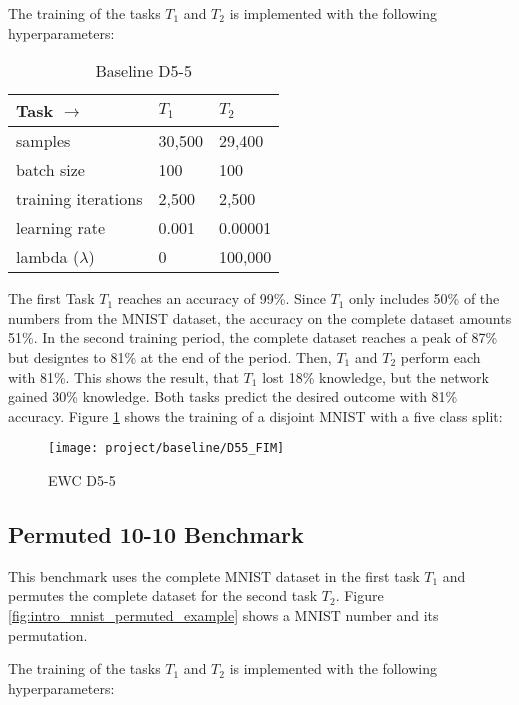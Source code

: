 The training of the tasks $T_1$ and $T_2$ is implemented with the following hyperparameters:

\begin{table}[H]
    \centering
    \begin{tabular}{ |l|l|l|  }
        \hline
        Task $\to$ & $T_1$ & $T_2$ \\
        \hline\hline
        samples & 30,500 & 29,400 \\
        \hline
        batch size & 100 & 100 \\
        \hline
        training iterations & 2,500 & 2,500 \\
        \hline
        learning rate & 0.001 & 0.00001 \\
        \hline
        lambda ($\lambda$) & 0 & 100,000 \\
        \hline
    \end{tabular}
    \caption{Baseline D5-5}
    \label{table:base_d55}
\end{table}

The first Task $T_1$ reaches an accuracy of 99\%.
Since $T_1$ only includes 50\% of the numbers from the MNIST dataset, the accuracy on the complete dataset amounts 51\%.
In the second training period, the complete dataset reaches a peak of 87\% but designtes to 81\% at the end of the period.
Then, $T_1$ and $T_2$ perform each with 81\%.
\newline
This shows the result, that $T_1$ lost 18\% knowledge, but the network gained 30\% knowledge. Both tasks predict the desired outcome with 81\% accuracy.
\newline
Figure \ref{fig:ewc_d5-5} shows the training of a disjoint MNIST with a five class split:

\begin{figure}[H]
    \centering
    \texttt{[image: project/baseline/D55\_FIM]}
    \caption{EWC D5-5}
    \label{fig:ewc_d5-5}
\end{figure}

\subsection{Permuted 10-10 Benchmark}

This benchmark uses the complete MNIST dataset in the first task $T_1$ and permutes the complete dataset for the second task $T_2$.
Figure \ref{fig:intro_mnist_permuted_example} shows a MNIST number and its permutation.

The training of the tasks $T_1$ and $T_2$ is implemented with the following hyperparameters:

